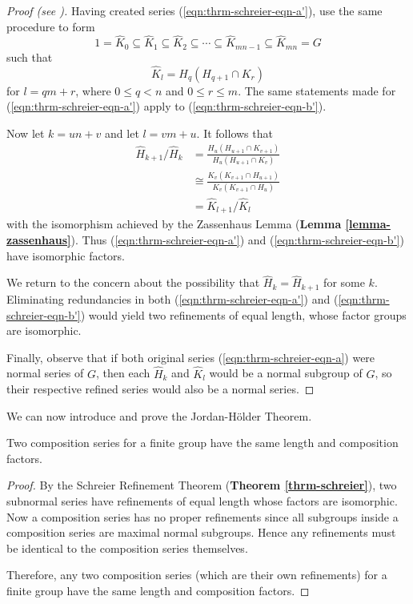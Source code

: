 \begin{proof}[Proof (see {\cite[\S 72]{clark_1984}})]
    Having created series (\ref{eqn:thrm-schreier-eqn-a'}), use the same procedure to form
    \begin{equation}\label{eqn:thrm-schreier-eqn-b'}
        1 = \hat{K}_0 \subseteq \hat{K}_1 \subseteq \hat{K}_2 \subseteq \cdots \subseteq \hat{K}_{mn - 1} \subseteq \hat{K}_{mn} = G
        \tag{B'}
    \end{equation}
    such that
    \[
        \hat{K}_l = H_q(H_{q+1}\cap K_r)
    \]
    for $l = qm + r$, where $0 \leq q < n$ and $0 \leq r \leq m$. The same statements made for (\ref{eqn:thrm-schreier-eqn-a'}) apply to (\ref{eqn:thrm-schreier-eqn-b'}).
    
    Now let $k = un + v$ and let $l = vm + u$. It follows that
    \begin{align*}
        \hat{H}_{k+1}/\hat{H}_k &= \frac{H_u(H_{u+1}\cap K_{v+1})}{H_u(H_{u+1}\cap K_v)}\\
        &\cong \frac{K_v(K_{v+1}\cap H_{u+1})}{K_v(K_{v+1}\cap H_u)}\\
        &= \hat{K}_{l+1}/\hat{K}_l
    \end{align*}
    with the isomorphism achieved by the Zassenhaus Lemma (\textbf{Lemma \ref{lemma-zassenhaus}}). Thus (\ref{eqn:thrm-schreier-eqn-a'}) and (\ref{eqn:thrm-schreier-eqn-b'}) have isomorphic factors.
    
    We return to the concern about the possibility that $\hat{H}_k = \hat{H}_{k+1}$ for some $k$. Eliminating redundancies in both (\ref{eqn:thrm-schreier-eqn-a'}) and (\ref{eqn:thrm-schreier-eqn-b'}) would yield two refinements of equal length, whose factor groups are isomorphic.
    
    Finally, observe that if both original series (\ref{eqn:thrm-schreier-eqn-a}) were normal series of $G$, then each $\hat{H}_k$ and $\hat{K}_l$ would be a normal subgroup of $G$, so their respective refined series would also be a normal series.
\end{proof}

We can now introduce and prove the Jordan-H\"older Theorem.
\begin{theorem}\label{thrm-jordan-holder}
    Two composition series for a finite group have the same length and composition factors.
\end{theorem}
\begin{proof}
    By the Schreier Refinement Theorem (\textbf{Theorem \ref{thrm-schreier}}), two subnormal series have refinements of equal length whose factors are isomorphic. Now a composition series has no proper refinements since all subgroups inside a composition series are maximal normal subgroups. Hence any refinements must be identical to the composition series themselves.
    
    Therefore, any two composition series (which are their own refinements) for a finite group have the same length and composition factors.
\end{proof}

